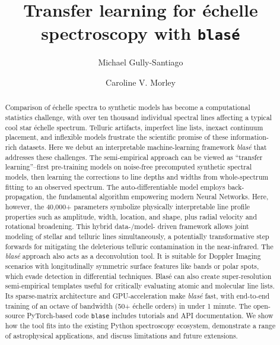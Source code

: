 \documentclass[modern]{aastex631}
\begin{document}
\title{Transfer learning for \'echelle spectroscopy with \texttt{blas\'e}}

\author{Michael Gully-Santiago}

\author{Caroline V. Morley}

\begin{abstract}

    Comparison of \'echelle spectra to synthetic models has become a computational statistics challenge, with over ten thousand individual spectral lines affecting a typical cool star \'echelle spectrum.  Telluric artifacts, imperfect line lists, inexact continuum placement, and inflexible models frustrate the scientific promise of these information-rich datasets.  Here we debut an interpretable machine-learning framework \emph{blas\'e} that addresses these challenges.  The semi-empirical approach can be viewed as ``transfer learning''--first pre-training models on noise-free precomputed synthetic spectral models, then learning the corrections to line depths and widths from whole-spectrum fitting to an observed spectrum.  The auto-differentiable model employs back-propagation, the fundamental algorithm empowering modern Neural Networks. Here, however, the 40,000+ parameters symbolize physically interpretable line profile properties such as amplitude, width, location, and shape, plus radial velocity and rotational broadening.  This hybrid data-/model- driven framework allows joint modeling of stellar and telluric lines simultaneously, a potentially transformative step forwards for mitigating the deleterious telluric contamination in the near-infrared.  The \emph{blas\'e} approach also acts as a deconvolution tool. It is suitable for Doppler Imaging scenarios with longitudinally symmetric surface features like bands or polar spots, which evade detection in differential techniques.  Blas\'e can also create super-resolution semi-empirical templates useful for critically evaluating atomic and molecular line lists.  Its sparse-matrix architecture and GPU-acceleration make \emph{blas\'e} fast, with end-to-end training of an octave of bandwidth (50+ \'echelle orders) in under 1 minute.  The open-source PyTorch-based code \texttt{blase} includes tutorials and API documentation.  We show how the tool fits into the existing Python spectroscopy ecosystem, demonstrate a range of astrophysical applications, and discuss limitations and future extensions.


\end{abstract}
\end{document}
